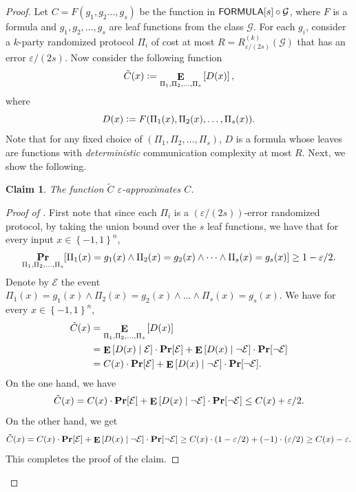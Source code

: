 \documentclass[10pt,a4paper]{article}
\newtheorem{claim}[theorem]{Claim}
\DeclareMathOperator*\Exp{{\bf E}}
\DeclareMathOperator*\Prob{{\bf Pr}}
\newcommand{\boolpm}{\left\{-1,1\right\}}
\newcommand{\FORMULA}{{\sf FORMULA}}
\newcommand{\given}{\mid}
\begin{document}
    \begin{proof}
        Let $C=F(g_1,g_2\dots,g_s)$ be the function in $\FORMULA[s]\circ\mathcal{G}$, where $F$ is a formula and $g_1,g_2,\dots,g_s$ are leaf functions from the class $\mathcal{G}$. For each  $g_i$, consider a $k$-party randomized protocol $ \Pi_i$ of cost at most $R=R^{(k)}_{\varepsilon/(2s)}(\mathcal{G})$ that has an error $\varepsilon/(2s)$.
        Now consider the following function
        \[
            \tilde{C}(x) \vcentcolon=\Exp_{\Pi_1,\Pi_2,\dots,\Pi_s}\left[D(x)\right],
        \]
        where
        \[
            D(x) \vcentcolon= F(\Pi_1(x),\Pi_2(x),\dots,\Pi_s(x)).
        \]
        Note that for any fixed choice of $(\Pi_1,\Pi_2,\dots,\Pi_s)$, $D$ is a formula whose leaves are functions with \emph{deterministic} communication complexity at most $R$. Next, we show the following.
        
        \begin{claim}\label{claim:lb-approximating}
            The function $\tilde{C}$ $\varepsilon$-approximates $C$.
        \end{claim}
        
        \begin{proof}[Proof of ]
            First note that since each $\Pi_i$ is a $(\varepsilon/(2s))$-error randomized protocol, by taking the union bound over the $s$ leaf functions, we have that for every input $x\in\boolpm^n$,
            \[
                \Prob_{\Pi_1,\Pi_2,\dots,\Pi_s}[\Pi_1(x)=g_1(x) \land \Pi_2(x)=g_2(x) \land\dots\land\Pi_s(x)=g_s(x)]\geq 1-\varepsilon/2.
            \]
            Denote by $\mathcal{E}$ the event $\Pi_1(x)=g_1(x) \land \Pi_2(x)=g_2(x)\land\dots\land\Pi_s(x)=g_s(x)$. We have for every $x\in\boolpm^n$,
            \begin{align*}
                \tilde{C}(x) &= \Exp_{\Pi_1,\Pi_2,\dots,\Pi_s}\left[D(x)\right]\\
                &=\Exp\left[D(x)\given \mathcal{E}\right]\cdot\Prob[\mathcal{E}]+\Exp\left[D(x)\given \neg\mathcal{E}\right]\cdot\Prob[\neg\mathcal{E}]\\
                &=C(x)\cdot\Prob[\mathcal{E}]+\Exp\left[D(x)\given \neg\mathcal{E}\right]\cdot\Prob[\neg\mathcal{E}].
            \end{align*}
            On the one hand, we have
            \[
                \tilde{C}(x)=C(x)\cdot\Prob[\mathcal{E}]+\Exp\left[D(x)\given \neg\mathcal{E}\right]\cdot\Prob[\neg\mathcal{E}]\leq  C(x) + \varepsilon/2.
            \]
            On the other hand, we get
            \[
                \tilde{C}(x)=C(x)\cdot\Prob[\mathcal{E}]+\Exp\left[D(x)\given \neg\mathcal{E}\right]\cdot\Prob[\neg\mathcal{E}]\geq C(x)\cdot(1-\varepsilon/2)+(-1)\cdot(\varepsilon/2)\geq C(x)-\varepsilon.
            \]
            This completes the proof of the claim.
        \end{proof}
        

\end{proof}
\end{document}
